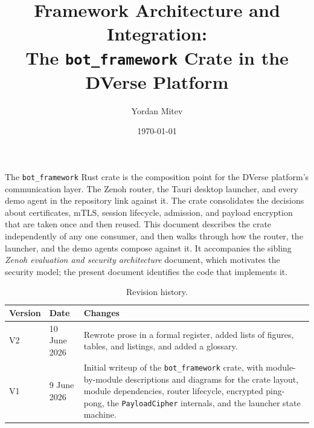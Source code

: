 \documentclass[11pt,a4paper]{article}
\title{%
  \vspace{-1cm}
  {\LARGE\bfseries Framework Architecture and Integration:\\
  The \texttt{bot\_framework} Crate in the DVerse Platform}
}
\author{Yordan Mitev}
\date{\today}
\begin{document}
\maketitle
\thispagestyle{fancy}

\begin{abstractbox}
  The \texttt{bot\_framework} Rust crate is the composition point
  for the DVerse platform's communication layer. The Zenoh
  router, the Tauri desktop launcher, and every demo agent in the
  repository link against it. The crate consolidates the
  decisions about certificates, mTLS, session lifecycle,
  admission, and payload encryption that are taken once and then
  reused. This document describes the crate independently of any
  one consumer, and then walks through how the router, the
  launcher, and the demo agents compose against it. It accompanies
  the sibling \emph{Zenoh evaluation and security architecture}
  document, which motivates the security model; the present
  document identifies the code that implements it.
\end{abstractbox}

\vspace{1em}

\begin{table}[H]
  \centering
  \small
  \begin{tabular}{|l|l|p{7.5cm}|}
    \hline
    \rowcolor{gray!15}
    \textbf{Version} & \textbf{Date} & \textbf{Changes} \\
    \hline
    V2 & 10 June 2026 & Rewrote prose in a formal register,
    added lists of figures, tables, and listings, and added a
    glossary. \\
    \hline
    V1 & 9 June 2026 & Initial writeup of the
    \texttt{bot\_framework} crate, with module-by-module
    descriptions and diagrams for the crate layout, module
    dependencies, router lifecycle, encrypted ping-pong, the
    \texttt{PayloadCipher} internals, and the launcher state
    machine. \\
    \hline
  \end{tabular}
  \caption{Revision history.}
  \label{tab:framework-history}
\end{table}

\newpage
\tableofcontents
\newpage
\listoffigures
\vspace{1em}
\listoftables
\vspace{1em}
\renewcommand{\lstlistlistingname}{List of Listings}
\lstlistoflistings

\newpage
\end{document}
